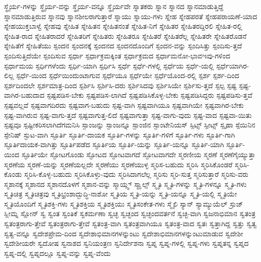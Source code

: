 {ಸ್ಥೈರ್ಯ-ಗಳನ್ನು
ಸ್ಥೈರ್ಯ-ವನ್ನು
ಸ್ಥೈರ್ಯ-ವನ್ನೂ
ಸ್ಥೈರ್ಯವೇ
ಸ್ನಾತಕರು
ಸ್ನಾನ
ಸ್ನಾನದ
ಸ್ನಾನಮಾಡುತ್ತಿದ್ದೆ
ಸ್ನಾನಮಾಡುತ್ತಿರುವ
ಸ್ನಾನವು
ಸ್ನಾನಶೀಲರಾಗುತ್ತಾರೆ
ಸ್ನಾಯು
ಸ್ನಾಯು-ಗಳು
ಸ್ನೇಹ
ಸ್ನೇಹಪರತೆ
ಸ್ನೇಹಪರಾಯಣೆ-ಯಾದ
ಸ್ನೇಹಯುಕ್ತಬಾಳ್ವೆ
ಸ್ನೇಹವು
ಸ್ನೇಹಿತ
ಸ್ನೇಹಿತನ
ಸ್ನೇಹಿತನಂತೆ
ಸ್ನೇಹಿತ-ನಿಗೆ
ಸ್ನೇಹಿತರ
ಸ್ನೇಹಿತರದ್ದಿರಲಿ
ಸ್ನೇಹಿತ-ರಲ್ಲಿ
ಸ್ನೇಹಿತ-ರಾದ
ಸ್ನೇಹಿತರಾದರೆ
ಸ್ನೇಹಿತರಿಗೆ
ಸ್ನೇಹಿತರು
ಸ್ನೇಹಿತರೂ
ಸ್ನೇಹಿತರೆ
ಸ್ನೇಹಿತರೆಲ್ಲ
ಸ್ನೇಹಿತರೇ
ಸ್ನೇಹಿತರೊಡನೆ
ಸ್ನೇಹಿತೆಗೆ
ಸ್ನೇಹಿತೆಯು
ಸ್ಪಂದನ
ಸ್ಪಂದನಕ್ಕೆ
ಸ್ಪಂದನದ
ಸ್ಪಂದನದೊಂದಿಗೆ
ಸ್ಪಂದನ-ವನ್ನು
ಸ್ಪಂದಿಸಿತ್ತು
ಸ್ಪಂದಿಸು-ತ್ತದೆ
ಸ್ಪಂದಿಸುತ್ತಿದೆಯೇ
ಸ್ಪಂದಿಸುವ
ಸ್ಪರ್ಧಾ
ಸ್ಪರ್ಧಾಕ್ರಮಕ್ಕಿಂತ
ಸ್ಪರ್ಧಾಕ್ರಮದ
ಸ್ಪರ್ಧಾಮನೋ-ಭಾವಇವು-ಗಳಿಂದ
ಸ್ಪರ್ಧಾಮಯ
ಸ್ಪರ್ಧಿಗಳೆಂದು
ಸ್ಪರ್ಧಿ-ಯಾಗಿ
ಸ್ಪರ್ಧಿಸಿ
ಸ್ಪರ್ಧೆ
ಸ್ಪರ್ಧೆ-ಗಳಲ್ಲಿ
ಸ್ಪರ್ಧೆಯ
ಸ್ಪರ್ಧೆ-ಯಲ್ಲಿ
ಸ್ಪರ್ಧೆಯಾಗಿರ-ಲಿಲ್ಲ
ಸ್ಪರ್ಧೆ-ಯಿಂದ
ಸ್ಪರ್ಧೆಯಿಂದುಂಟಾಗುವ
ಸ್ಪರ್ಧೆಯೂ
ಸ್ಪರ್ಧೆಯೇ
ಸ್ಪರ್ಧೆಯೊಂದ-ರಲ್ಲಿ
ಸ್ಪರ್ಶ
ಸ್ಪರ್ಶ-ದಿಂದ
ಸ್ಪರ್ಶದಿಂದಲೇ
ಸ್ಪರ್ಶಮಾತ್ರ-ದಿಂದ
ಸ್ಪರ್ಶಿಸಿ
ಸ್ಪರ್ಶಿಸಿ-ದರು
ಸ್ಪರ್ಶಿಸಿದವು
ಸ್ಪರ್ಶಿಸಿಯೇ
ಸ್ಪರ್ಶಿಸು-ತ್ತದೆ
ಸ್ಪಲ್ಪ
ಸ್ಪಷ್ಟ
ಸ್ಪಷ್ಟ-ವಾಗಿರ-ಬಹುದಾದ
ಸ್ಪಷ್ಟಪಡಿಸ-ಬೇಕು
ಸ್ಪಷ್ಟಪಡಿಸ-ಲಾಗಿದೆ
ಸ್ಪಷ್ಟಪಡಿಸಿಕೊಳ್ಳ-ಬೇಕು
ಸ್ಪಷ್ಟಪಡಿಸಿದ್ದರು
ಸ್ಪಷ್ಟಪಡಿಸು-ತ್ತವೆ
ಸ್ಪಷ್ಟವಲ್ಲವೆ
ಸ್ಪಷ್ಟವಾಗದಿರದು
ಸ್ಪಷ್ಟವಾಗ-ಬಹುದು
ಸ್ಪಷ್ಟ-ವಾಗಿ
ಸ್ಪಷ್ಟವಾಗಿಯೂ
ಸ್ಪಷ್ಟವಾಗಿಯೇ
ಸ್ಪಷ್ಟವಾಗಿರ-ಬೇಕು
ಸ್ಪಷ್ಟ-ವಾಗಿರುವ
ಸ್ಪಷ್ಟ-ವಾಗು-ತ್ತದೆ
ಸ್ಪಷ್ಟವಾಗುತ್ತ-ಲಿದೆ
ಸ್ಪಷ್ಟವಾಗುತ್ತಾ
ಸ್ಪಷ್ಟ-ವಾಗು-ವುದು
ಸ್ಪಷ್ಟ-ವಾದ
ಸ್ಪಷ್ಟವಾ-ಯಿತು
ಸ್ಪಷ್ಟವೂ
ಸ್ಪಷ್ಟೀಕರಿಸಲಾಗಿದೆಗಮನಿಸಿ
ಸ್ಪಾಂಜನ್ನು
ಸ್ಪಾಂಜನ್ನೂ
ಸ್ಪಾಂಜಿನ
ಸ್ಪಾಂಟೇನಿಯಸ್
ಸ್ಪಿಟ್ಸ್
ಸ್ಪೀಟ್ಸ್
ಸ್ಪೃಹಾ
ಸ್ಪೆಯಿನಿನ
ಸ್ಪೇನಿಷ್
ಸ್ಫುಟ-ವಾಗಿ
ಸ್ಫೂರ್ತಿ
ಸ್ಫೂರ್ತಿ-ದಾಯಕ
ಸ್ಫೂರ್ತಿ-ಗಳನ್ನು
ಸ್ಫೂರ್ತಿ-ಗಳಿಗೆ
ಸ್ಫೂರ್ತಿ-ಗಳು
ಸ್ಫೂರ್ತಿ-ಗಾಗಿ
ಸ್ಫೂರ್ತಿದಾಯಕ-ವಾಗಿತ್ತು
ಸ್ಫೂರ್ತಿಪಡೆದ
ಸ್ಫೂರ್ತಿಯ
ಸ್ಫೂರ್ತಿ-ಯನ್ನು
ಸ್ಫೂರ್ತಿ-ಯನ್ನೂ
ಸ್ಫೂರ್ತಿ-ಯಾಗಿ
ಸ್ಫೂರ್ತಿ-ಯಿಂದ
ಸ್ಫೂರ್ತಿಯೇ
ಸ್ಫೋಟಗೊಂಡು
ಸ್ಫೋಟದ
ಸ್ಫೋಟವಾಗದೆ
ಸ್ಫೋಟವಾಗದೇ
ಸ್ಮರಣೀಯ
ಸ್ಮರಣೆ
ಸ್ಮರಣೆಗೈಯ್ಯುತ್ತಾ
ಸ್ಮರಣೆಯ
ಸ್ಮರಣೆ-ಯನ್ನು
ಸ್ಮರಣೆಯಲ್ಲದೇ
ಸ್ಮರಣೆಯು
ಸ್ಮರಣೆಯುಳ್ಳ
ಸ್ಮರಿಸ-ಬಹುದು
ಸ್ಮರಿಸಿ
ಸ್ಮರಿಸಿಕೊಂಡರೆ
ಸ್ಮರಿಸಿ-ಕೊಂಡು
ಸ್ಮರಿಸಿ-ಕೊಳ್ಳ-ಬಹುದು
ಸ್ಮರಿಸಿಕೊಳ್ಳು-ವುದು
ಸ್ಮರಿಸಿದಾಗಲೆಲ್ಲ
ಸ್ಮರಿಸು
ಸ್ಮರಿ-ಸುತ್ತ
ಸ್ಮರಿಸುತ್ತಾರೆ
ಸ್ಮರಿಸು-ವರು
ಸ್ಮಶಾನಕ್ಕೆ
ಸ್ಮಶಾನದ
ಸ್ಮಶಾನದೊಳಗೆ
ಸ್ಮಶಾನ-ವನ್ನು
ಸ್ಮಾಯ್ಲ್ಸ್
ಸ್ಮಾೖಲ್ಸ್
ಸ್ಮೃತಿ
ಸ್ಮೃತಿ-ಗಳನ್ನು
ಸ್ಮೃತಿ-ಗಳನ್ನೂ
ಸ್ಮೃತಿ-ಗಳು
ಸ್ಮೃತಿಚಿತ್ರ
ಸ್ಮೃತಿಚಿತ್ರವು
ಸ್ಮೃತಿಭ್ರಂಶಾದ್ಬುದ್ಧಿ-ನಾಶೋ
ಸ್ಮೃತಿಯ
ಸ್ಮೃತಿ-ಯನ್ನು
ಸ್ಮೃತಿ-ಯನ್ನೂ
ಸ್ಮೃತಿ-ಯಲ್ಲಿ
ಸ್ಮೃತಿಯೇ
ಸ್ಮೃತಿಯೊಂದಿಗೆ
ಸ್ಮೃತಿಶಕ್ತಿ-ಗಳು
ಸ್ಮೃತಿಶಕ್ತಿಯ
ಸ್ಮೃತಿಶಕ್ತಿಯು
ಸ್ಮೃತಿಸಂಕೇತ-ಗಳು
ಸ್ಮೈಲಿ
ಸ್ಯಾನ್
ಸ್ಯಾಮ್ಯುಯೆಲ್
ಸ್ರುಜ್
ಸ್ಲೀಮ್ನ
ಸ್ಲೋನ್
ಸ್ವ
ಸ್ವಂತ
ಸ್ವಂತಿಕೆ
ಸ್ವಕರ್ಮಣಾ
ಸ್ವಚ್ಛ
ಸ್ವಚ್ಛಂದ
ಸ್ವಚ್ಛಂದವರ್ತನೆ
ಸ್ವಚ್ಛ-ವಾಗಿ
ಸ್ವಜನಾಭಿಮಾನ
ಸ್ವತಂತ್ರ
ಸ್ವತಂತ್ರರಾಗು-ತ್ತೇವೆ
ಸ್ವತಂತ್ರರಾಗು-ತ್ತೇವೆ
ಸ್ವತಂತ್ರ-ವಾಗಿ
ಸ್ವತಂತ್ರವಾಗಿಯೂ
ಸ್ವತಂತ್ರ-ವಾದ
ಸ್ವತಃ
ಸ್ವತ್ತಾಗಿದ್ದ
ಸ್ವತ್ತು
ಸ್ವತ್ವ
ಸ್ವತ್ವ-ವನ್ನೂ
ಸ್ವದೇಶಪ್ರೇಮ-ದಿಂದ
ಸ್ವದೇಶಾಭಿಮಾನಗಳನ್ನುಂಟು
ಸ್ವದೇಶಾಭಿಮಾನಗಳನ್ನುಂಟುಮಾಡುವ
ಸ್ವದೇಶೀ
ಸ್ವದೇಶೀಯರೇ
ಸ್ವದೋಷ
ಸ್ವನಾಶದ
ಸ್ವನಿಯಂತ್ರಣ
ಸ್ವನಿರ್ದೇಶನಾ
ಸ್ವಪ್ನ
ಸ್ವಪ್ನ-ಗಳಲ್ಲಿ
ಸ್ವಪ್ನ-ಗಳು
ಸ್ವಪ್ನತನ್ನ
ಸ್ವಪ್ನದ
ಸ್ವಪ್ನ-ದಲ್ಲಿ
ಸ್ವಪ್ನದಲ್ಲೂ
ಸ್ವಪ್ನ-ವನ್ನು
ಸ್ವಪ್ನ-ವೆಂದು
}
